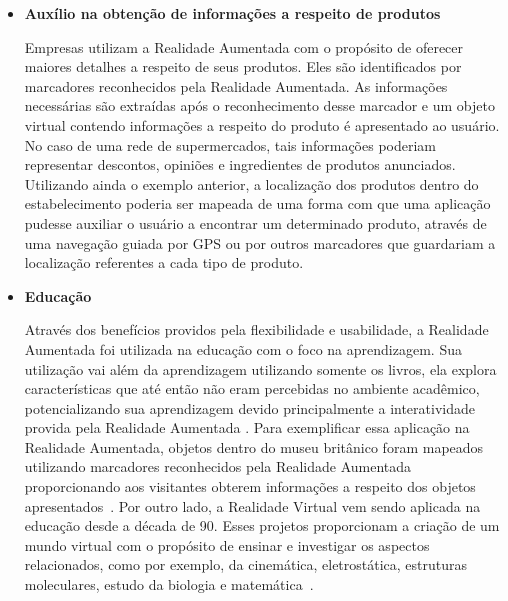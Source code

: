 \begin{itemize}
	  \item \textbf{Auxílio na obtenção de informações a respeito de produtos} 
	  
	  		Empresas utilizam a Realidade Aumentada com o propósito de oferecer maiores detalhes a respeito
	  		de seus produtos. Eles são identificados por marcadores reconhecidos pela Realidade Aumentada.
	  		As informações necessárias são extraídas após o reconhecimento desse marcador e um objeto
	  		virtual contendo informações a respeito do produto é apresentado ao usuário. No caso de uma
	  		rede de supermercados, tais informações poderiam representar descontos, opiniões e ingredientes
	  		de produtos anunciados. Utilizando ainda o exemplo anterior, a localização dos produtos dentro
	  		do estabelecimento poderia ser mapeada de uma forma com que uma aplicação pudesse auxiliar o
	  		usuário a encontrar um determinado produto, através de uma navegação guiada por GPS
	  		ou por outros marcadores que guardariam a localização referentes a cada tipo de produto.
			
							  		
	  
	  \item \textbf{Educação}  
	  
	  		Através dos benefícios providos pela flexibilidade e usabilidade, a Realidade
	  		Aumentada foi utilizada na educação com o foco na aprendizagem. Sua utilização vai
	  		além da aprendizagem utilizando somente os livros, ela explora características que até então
	  		não eram percebidas no ambiente acadêmico, potencializando sua aprendizagem devido
	  		principalmente a interatividade provida pela Realidade Aumentada
	  		\cite{kaufmann,markBillinghurst}. Para exemplificar essa aplicação na Realidade Aumentada, 
	  		objetos dentro do museu britânico foram mapeados utilizando marcadores reconhecidos pela
	  		Realidade Aumentada proporcionando aos visitantes obterem informações a respeito dos objetos
	  		apresentados~\cite{museum}. Por outro lado, a Realidade Virtual vem sendo aplicada na educação
	  		desde a década de 90. Esses projetos proporcionam a criação de um mundo virtual com o propósito
	  		de ensinar e investigar os aspectos relacionados, como por exemplo, da cinemática,
	  		eletrostática, estruturas moleculares, estudo da biologia e matemática~\cite{ko, hannes}.
			

\end{itemize}
